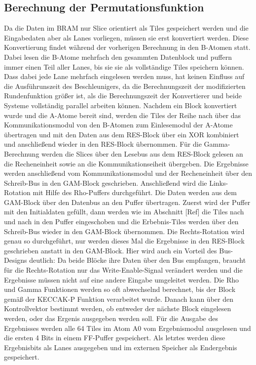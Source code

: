 \subsection{Berechnung der Permutationsfunktion}
Da die Daten im BRAM nur Slice orientiert als Tiles gespeichert werden und die Eingabedaten aber als Lanes vorliegen, müssen sie erst konvertiert werden.
Diese Konvertierung findet während der vorherigen Berechnung in den B-Atomen statt.
Dabei lesen die B-Atome mehrfach den gesammten Datenblock und puffern immer einen Teil aller Lanes, bis sie sie als vollständige Tiles speichern können.
Dass dabei jede Lane mehrfach eingelesen werden muss, hat keinen Einfluss auf die Ausführunszeit des Beschleunigers, da die Berechnungszeit der modifizierten Rundenfunktion größer ist,
als die Berechnungszeit der Konvertierer und beide Systeme vollständig parallel arbeiten können.
Nachdem ein Block konvertiert wurde und die A-Atome bereit sind, werden die Tiles der Reihe nach über das Kommunikationsmodul von den B-Atomen zum Einlesemodul der A-Atome übertragen
und mit den Daten aus dem RES-Block über ein XOR kombiniert und anschließend wieder in den RES-Block übernommen.
Für die Gamma-Berechnung werden die Slices über den Lesebus aus dem RES-Block gelesen an die Recheneinheit sowie an die Kommunikationseiheit übergeben.
Die Ergebnisse werden anschließend vom Kommunikationsmodul und der Recheneinheit über den Schreib-Bus in den GAM-Block geschrieben.
Anschließend wird die Links-Rotation mit Hilfe des Rho-Puffers durchgeführt. Die Daten werden aus dem GAM-Block über den Datenbus an den Puffer übertragen.
Zuerst wird der Puffer mit den Initialdaten gefüllt, dann werden wie im Abschnitt [Ref] die Tiles nach und nach in den Puffer eingeschoben
und die Erbebnis-Tiles werden über den Schreib-Bus wieder in den GAM-Block übernommen.
Die Rechts-Rotation wird genau so durchgeführt, nur werden dieses Mal die Ergebnisse in den RES-Block geschrieben anstatt in den GAM-Block.
Hier wird auch ein Vorteil des Bus-Designs deutlich: Da beide Blöcke ihre Daten über den Bus empfangen, braucht für die Rechts-Rotation nur das
Write-Enable-Signal verändert werden und die Ergebnisse müssen nicht auf eine andere Eingabe umgeleitet werden.
Die Rho und Gamma Funktionen werden so oft abwechselnd berechnet, bis der Block gemäß der KECCAK-P Funktion verarbeitet wurde.
Danach kann über den Kontrollvektor bestimmt werden, ob entweder der nächste Block eingelesen werden, oder das Ergenis ausgegeben werden soll.
Für die Ausgabe des Ergebnisses werden alle 64 Tiles im Atom A0 vom Ergebnismodul ausgelesen und die ersten 4 Bits in einem FF-Puffer gespeichert.
Als letztes werden diese Ergebnisbits als Lanes ausgegeben und im externen Speicher als Endergebnis gespeichert.

